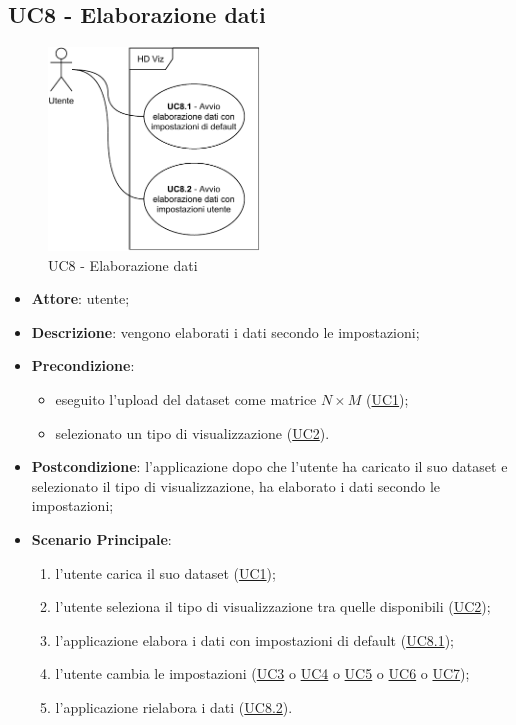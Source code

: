 \subsection{UC8 - Elaborazione dati}
    \label{uc8}
    
    \begin{figure}[htbp]
        \centering
        \includegraphics[width=0.5\textwidth]{source/sections/casi-uso/diagrams/uc8.pdf}
        \caption{UC8 - Elaborazione dati}
        \label{fig:uc8}
    \end{figure}
    
    \begin{itemize}
    \item \textbf{Attore}: utente;
    \item \textbf{Descrizione}: vengono elaborati i dati secondo le impostazioni;
    \item \textbf{Precondizione}: 
    \begin{itemize}
        \item eseguito l'upload del dataset come matrice $N\times M$ (\hyperref[uc1]{UC1});
        \item selezionato un tipo di visualizzazione (\hyperref[uc2]{UC2}).
    \end{itemize}  
    \item \textbf{Postcondizione}: l'applicazione dopo che l'utente ha caricato il suo dataset e selezionato il tipo di visualizzazione, ha elaborato i dati secondo le impostazioni;
    \item \textbf{Scenario Principale}: 
    \begin{enumerate}
        \item l'utente carica il suo dataset (\hyperref[uc1]{UC1});
        \item l'utente seleziona il tipo di visualizzazione tra quelle disponibili (\hyperref[uc2]{UC2});
        \item l'applicazione elabora i dati con impostazioni di default (\hyperref[uc8.1]{UC8.1});
        \item l'utente cambia le impostazioni (\hyperref[uc3]{UC3} o \hyperref[uc4]{UC4} o \hyperref[uc5]{UC5} o \hyperref[uc6]{UC6} o \hyperref[uc7]{UC7});
        \item l'applicazione rielabora i dati (\hyperref[uc8.2]{UC8.2}).
    \end{enumerate}
    \end{itemize}
    
